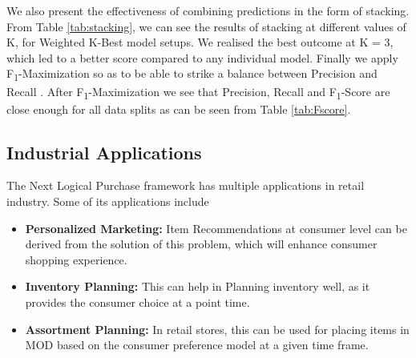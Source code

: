 We also present the effectiveness of combining predictions in the form of stacking. From Table \ref{tab:stacking}, we can see the 
results of stacking at different values of K, for Weighted K-Best model setups. We realised the best outcome at 
K = 3, which led to a better score compared to any individual model.
Finally we apply F\textsubscript{1}-Maximization so as to be able to strike a balance between Precision and Recall 
\cite{buckland1994relationship}.
After F\textsubscript{1}-Maximization we see that Precision, Recall and F\textsubscript{1}-Score 
are close enough for all data splits as can be seen from Table \ref{tab:Fscore}.
\subsection{Industrial Applications}
The Next Logical Purchase framework has multiple applications in retail industry. Some of its applications 
include
\begin{itemize}
\item {\bf Personalized Marketing:} Item Recommendations at consumer level can be derived from the 
solution of this problem, which will enhance consumer shopping experience.
\item {\bf Inventory Planning:} This can help in Planning inventory well, as it provides the 
consumer choice at a point time.
\item {\bf Assortment Planning:} In retail stores, this can be used for placing items in MOD based on the 
consumer preference model at a given time frame.
\end{itemize}
